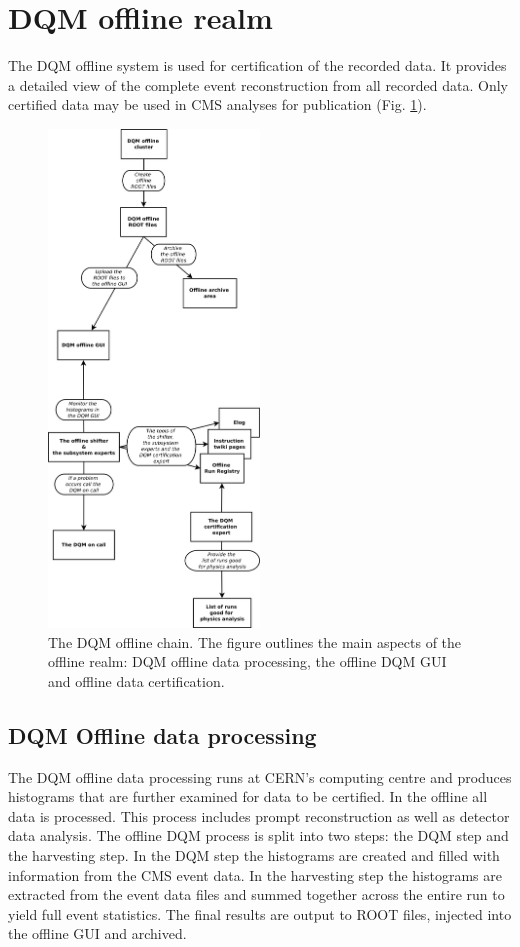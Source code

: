 \documentclass[journal]{IEEEtran}
\begin{document}

\section{DQM offline realm}
The DQM offline system is used for certification of the recorded data. It provides a detailed view of the complete event reconstruction from all recorded data. Only certified data may be used in CMS analyses for publication (Fig. \ref{OfflineChain}).

\begin{figure}
\includegraphics[width=0.5\textwidth, keepaspectratio=true]{OfflineChain.png}
\caption{The DQM offline chain. The figure outlines the main aspects of the offline realm: DQM offline data processing, the offline DQM GUI and offline data certification.}
\label{OfflineChain}
\end{figure}

\subsection{DQM Offline data processing}
The DQM offline data processing runs at CERN’s computing centre and produces histograms that are further examined for data to be certified. In the offline all data is processed. This process includes prompt reconstruction as well as detector data analysis. The offline DQM process is split into two steps: the DQM step and the harvesting step. In the DQM step the histograms are created and filled with information from the CMS event data. In the harvesting step the histograms are extracted from the event data files and summed together across the entire run to yield full event statistics. The final results are output to ROOT files, injected into the offline GUI and archived.
\end{document}
